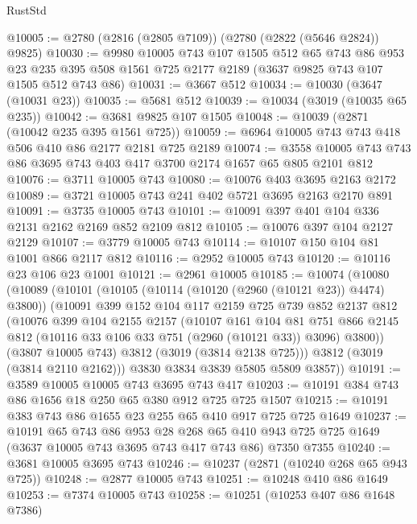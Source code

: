 \begin{lexlean}{RustStd}
\begin{coremodule}
@10005 := @2780 (@2816 (@2805 @7109)) (@2780 (@2822 (@5646 @2824)) @9825)
@10030 := @9980
    @10005
    @743
    @107
    @1505
    @512
    @65
    @743
    @86
    @953
    @23
    @235
    @395
    @508
    @1561
    @725
    @2177
    @2189
    (@3637 @9825 @743 @107 @1505 @512 @743 @86)
@10031 := @3667 @512
@10034 := @10030 (@3647 (@10031 @23))
@10035 := @5681 @512
@10039 := @10034 (@3019 (@10035 @65 @235))
@10042 := @3681 @9825 @107 @1505
@10048 := @10039 (@2871 (@10042 @235 @395 @1561 @725))
@10059 := @6964 @10005 @743 @743 @418 @506 @410 @86 @2177 @2181 @725 @2189
@10074 := @3558 @10005 @743 @743 @86 @3695 @743 @403 @417 @3700 @2174 @1657 @65 @805 @2101 @812
@10076 := @3711 @10005 @743
@10080 := @10076 @403 @3695 @2163 @2172
@10089 := @3721 @10005 @743 @241 @402 @5721 @3695 @2163 @2170 @891
@10091 := @3735 @10005 @743
@10101 := @10091 @397 @401 @104 @336 @2131 @2162 @2169 @852 @2109 @812
@10105 := @10076 @397 @104 @2127 @2129
@10107 := @3779 @10005 @743
@10114 := @10107 @150 @104 @81 @1001 @866 @2117 @812
@10116 := @2952 @10005 @743
@10120 := @10116 @23 @106 @23 @1001
@10121 := @2961 @10005
@10185 := @10074
    (@10080
      (@10089
        (@10101
          (@10105 (@10114 (@10120 (@2960 (@10121 @23)) @4474) @3800))
          (@10091
            @399
            @152
            @104
            @117
            @2159
            @725
            @739
            @852
            @2137
            @812
            (@10076
              @399
              @104
              @2155
              @2157
              (@10107
                @161
                @104
                @81
                @751
                @866
                @2145
                @812
                (@10116 @33 @106 @33 @751 (@2960 (@10121 @33)) @3096)
                @3800))
            (@3807 @10005 @743)
            @3812
            (@3019 (@3814 @2138 @725)))
          @3812
          (@3019 (@3814 @2110 @2162)))
        @3830
        @3834
        @3839
        @5805
        @5809
        @3857))
@10191 := @3589 @10005 @10005 @743 @3695 @743 @417
@10203 := @10191 @384 @743 @86 @1656 @18 @250 @65 @380 @912 @725 @725 @1507
@10215 := @10191 @383 @743 @86 @1655 @23 @255 @65 @410 @917 @725 @725 @1649
@10237 := @10191
    @65
    @743
    @86
    @953
    @28
    @268
    @65
    @410
    @943
    @725
    @725
    @1649
    (@3637 @10005 @743 @3695 @743 @417 @743 @86)
    @7350
    @7355
@10240 := @3681 @10005 @3695 @743
@10246 := @10237 (@2871 (@10240 @268 @65 @943 @725))
@10248 := @2877 @10005 @743
@10251 := @10248 @410 @86 @1649
@10253 := @7374 @10005 @743
@10258 := @10251 (@10253 @407 @86 @1648 @7386)

\end{coremodule}
\end{lexlean}
